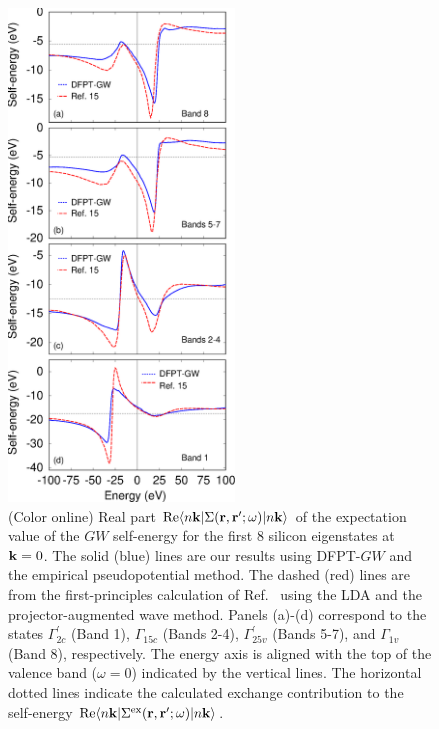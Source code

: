 \documentclass[twocolumn,prb,showpacs,superscriptaddress]{revtex4}
\def\w{\omega}
\def\k{{\bf k}}
\def\r{{\bf r}}
\def\rp{{\bf r^\prime}}
\begin{document}
\begin  {figure}
\begin  {center}
\includegraphics[width=6cm]{fig4.eps}
\end    {center}
\caption{\label{fig.sigma}
        (Color online)
        Real part ${\rm Re} \langle n\k| \Sigma(\r,\rp;\w)|n\k\rangle$   of the expectation value of the $GW$ self-energy for the first 
        8 silicon eigenstates at $\k=0$. The solid (blue) lines are our results using DFPT-$GW$ and the empirical
        pseudopotential method. The dashed (red) lines are from the first-principles calculation of Ref.\  
        using the LDA and the projector-augmented wave method. Panels (a)-(d) correspond to the states
        $\Gamma^\prime_{2c}$ (Band 1), $\Gamma_{15c}$ (Bands 2-4), $\Gamma^\prime_{25v}$ (Bands 5-7), 
        and $\Gamma_{1v}$ (Band 8), respectively. The energy axis is aligned with the top of the valence band ($\w=0$) indicated by the vertical lines.
        The horizontal dotted lines indicate the calculated exchange contribution to the self-energy ${\rm Re} \langle n\k| \Sigma^{\rm ex}(\r,\rp;\w)|n\k\rangle$.
        }
\end    {figure}
\end{document}

